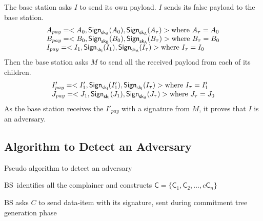 \documentclass[%
  slidesonly,%
  semlayer%
  ]{seminar}                                  %
\newcommand{\sk}{\sf{sk}}
\begin{document}
\begin{slide}
        The base station asks $I$ to send its own payload.
        $I$ sends its false payload to the base station.
        \begin{equation*}
          \begin{array}{l}
            A_{pay} = <A_{0}, \textsf{Sign}_{\sk_{A}}(A_{0}), \textsf{Sign}_{\sk_{A}}(A_{\tau})> \mbox{where}\ A_{\tau} = A_{0}\\
            B_{pay} = <B_{0}, \textsf{Sign}_{\sk_{B}}(B_{0}), \textsf{Sign}_{\sk_{A}}(B_{\tau})> \mbox{where}\ B_{\tau} = B_{0}\\
            I_{pay} = <I_{1}, \textsf{Sign}_{\sk_{I}}(I_{1}), \textsf{Sign}_{\sk_{A}}(I_{\tau})> \mbox{where}\ I_{\tau} = I_{0}\\
          \end{array}
        \end{equation*}
        Then the base station asks $M$ to send all the received payload from each of its children.
        \begin{equation*}
          \begin{array}{l}
            I'_{pay} = <I'_{1}, \textsf{Sign}_{\sk_{I}}(I'_{1}), \textsf{Sign}_{\sk_{I}}(I_{\tau})> \mbox{where}\ I_{\tau} = I'_{1}\\
            J_{pay} = <J_{1}, \textsf{Sign}_{\sk_{I}}(J_{1}), \textsf{Sign}_{\sk_{A}}(J_{\tau})> \mbox{where}\ J_{\tau} = J_{0}\\
          \end{array}
        \end{equation*}
        As the base station receives the $I'_{pay}$ with a signature from $M$, it proves that $I$ is an adversary.
        \vfill
        \clearpage

      \subsection*{Algorithm to Detect an Adversary}
        \begin{algorithm}
          \caption{Pseudo algorithm to detect an adversary}
          \label{algo:detect-an-adversary}
          \begin{algorithmic}[1]

            \STATE BS\ identifies all the complainer and constructs $\textsf{C} = \{\textsf{C}_{1}, \textsf{C}_{2}, \dotsc, c\textsf{C}_{n}\}$

              \STATE BS asks $C$ to send data-item with its signature, sent during commitment tree generation phase
            

\end{algorithmic}
\end{algorithm}
\end{slide}
\end{document}
